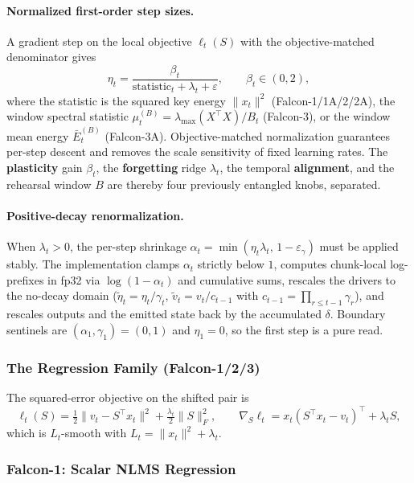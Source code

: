 \paragraph{Normalized first-order step sizes.} A gradient step on the local objective $\ell_t(S)$ with the objective-matched denominator gives
\[
\eta_t = \frac{\beta_t}{\text{statistic}_t + \lambda_t + \varepsilon}, \qquad \beta_t \in (0, 2),
\]
where the statistic is the squared key energy $\|x_t\|^2$ (Falcon-1/1A/2/2A), the window spectral statistic $\mu_t^{(B)} = \lambda_{\max}(X^\top X)/B_t$ (Falcon-3), or the window mean energy $\bar{E}_t^{(B)}$ (Falcon-3A). Objective-matched normalization guarantees per-step descent and removes the scale sensitivity of fixed learning rates. The \textbf{plasticity} gain $\beta_t$, the \textbf{forgetting} ridge $\lambda_t$, the temporal \textbf{alignment}, and the rehearsal window $B$ are thereby four previously entangled knobs, separated.

\paragraph{Positive-decay renormalization.} When $\lambda_t > 0$, the per-step shrinkage $\alpha_t = \min(\eta_t \lambda_t,\, 1 - \varepsilon_\gamma)$ must be applied stably. The implementation clamps $\alpha_t$ strictly below $1$, computes chunk-local log-prefixes in fp32 via $\log(1 - \alpha_t)$ and cumulative sums, rescales the drivers to the no-decay domain ($\tilde{\eta}_t = \eta_t / \gamma_t$, $\tilde{v}_t = v_t / c_{t-1}$ with $c_{t-1} = \prod_{r \le t-1} \gamma_r$), and rescales outputs and the emitted state back by the accumulated $\delta$. Boundary sentinels are $(\alpha_1, \gamma_1) = (0, 1)$ and $\eta_1 = 0$, so the first step is a pure read.

\subsubsection{The Regression Family (Falcon-1/2/3)}

The squared-error objective on the shifted pair is
\[
\ell_t(S) = \tfrac{1}{2}\|v_t - S^\top x_t\|^2 + \tfrac{\lambda_t}{2}\|S\|_F^2,
\qquad
\nabla_S \ell_t = x_t (S^\top x_t - v_t)^\top + \lambda_t S,
\]
which is $L_t$-smooth with $L_t = \|x_t\|^2 + \lambda_t$.

\subsubsection{Falcon-1: Scalar NLMS Regression}

